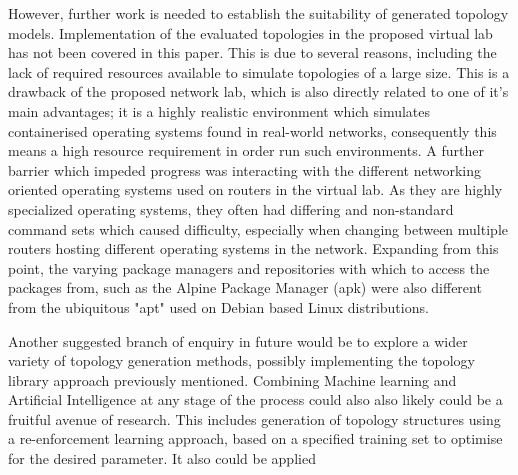  However, further work is needed to establish the suitability of generated topology models. Implementation of the evaluated topologies in the proposed virtual lab has not been covered in this paper. This is due to several reasons, including the lack of required resources available to simulate topologies of a large size. This is a drawback of the proposed network lab, which is also directly related to one of it's main advantages; it is a highly realistic environment which simulates containerised operating systems found in real-world networks, consequently this means a high resource requirement in order run such environments. A further barrier which impeded progress was interacting with the different networking oriented operating systems used on routers in the virtual lab. As they are highly specialized operating systems, they often had differing and non-standard command sets which caused difficulty, especially when changing between multiple routers hosting different operating systems in the network. Expanding from this point, the varying package managers and repositories with which to access the packages from, such as the Alpine Package Manager (apk)\cite{alpine} were also different from the ubiquitous "apt" used on Debian based Linux distributions. 

 Another suggested branch of enquiry in future would be to explore a wider variety of topology generation methods, possibly implementing the topology library approach previously mentioned. Combining Machine learning and Artificial Intelligence at any stage of the process could also also likely could be a fruitful avenue of research. This includes generation of topology structures using a re-enforcement learning approach, based on a specified training set to optimise for the desired parameter. It also could be applied 